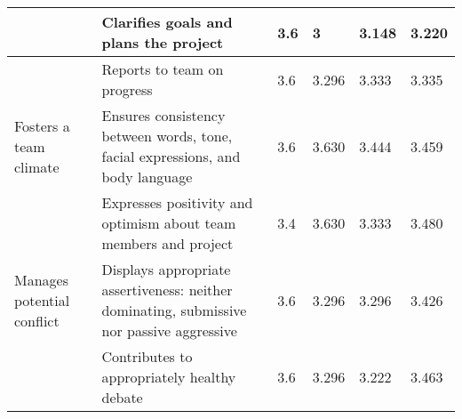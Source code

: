 \documentclass[sigconf, anonymous=true]{acmart}
\begin{document}
\begin{table*}[ht]
\begin{tabular} {| p{3cm} | p{8cm} | p{1cm}| p{1cm} | p{1cm}| p{1cm} |}
		\hline
		& Clarifies goals and plans the project                                                            & 3.6                                                     & 3                                                     & 3.148                                                 & 3.220                                               \\
		\hline
		& Reports to team on progress                                                                      & 3.6                                                     & 3.296                                                 & 3.333                                                 & 3.335                                               \\
		\hline
		Fosters a team climate              & Ensures consistency between words, tone, facial expressions, and body language                   & 3.6                                                     & 3.630                                                 & 3.444                                                 & 3.459                                               \\
		\hline
		& Expresses positivity and optimism about team members and project                                 & 3.4                                                     & 3.630                                                 & 3.333                                                 & 3.480                                               \\
		\hline
		Manages potential conflict          & Displays appropriate assertiveness: neither dominating, submissive nor passive aggressive        & 3.6                                                     & 3.296                                                 & 3.296                                                 & 3.426                                               \\
		\hline
		& Contributes to appropriately healthy debate                                                      & 3.6                                                     & 3.296                                                 & 3.222                                                 & 3.463                                               \\
		

\end{tabular}
\end{table*}
\end{document}
